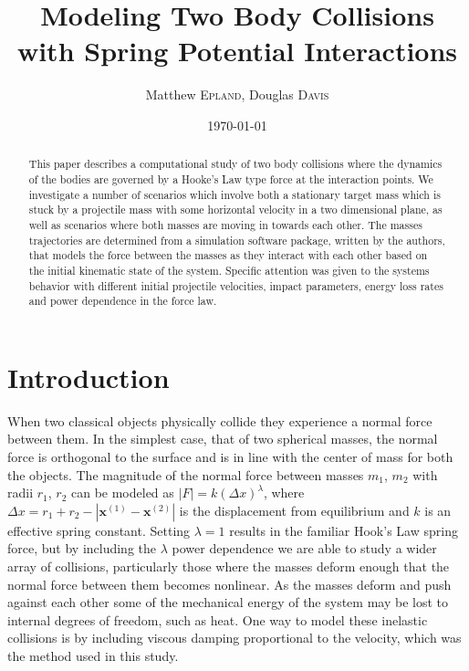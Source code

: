 \documentclass[aps,prl,floatfix,preprint,nofootinbib]{revtex4}
\begin{document}
\title{Modeling Two Body Collisions with Spring Potential Interactions}
\author{Matthew \textsc{Epland}, Douglas \textsc{Davis}}
\date{\today}

\hypersetup{pdftitle=Modeling Two Body Collisions}

\begin{abstract}
This paper describes a computational study of two body collisions where the dynamics of the bodies are governed by a Hooke's Law type force at the interaction points. We investigate a number of scenarios which involve both a stationary target mass which is stuck by a projectile mass with some horizontal velocity in a two dimensional plane, as well as scenarios where both masses are moving in towards each other. The masses trajectories are determined from a simulation software package, written by the authors, that models the force between the masses as they interact with each other based on the initial kinematic state of the system. Specific attention was given to the systems behavior with different initial projectile velocities, impact parameters, energy loss rates and power dependence in the force law.
\end{abstract}\maketitle
\section{Introduction}
When two classical objects physically collide they experience a normal force between them. In the simplest case, that of two spherical masses, the normal force is orthogonal to the surface and is in line with the center of mass for both the objects. The magnitude of the normal force between masses $m_{1}$, $m_{2}$ with radii $r_{1}$, $r_{2}$ can be modeled as $ \left| F \right| = k \left(\Delta x\right)^{\lambda}$, where $\Delta x = r_1 + r_2 - \left| \mathbf{x}^{(1)}-\mathbf{x}^{(2)} \right|$ is the displacement from equilibrium and $k$ is an effective spring constant. Setting $\lambda = 1$ results in the familiar Hook's Law spring force, but by including the $\lambda$ power dependence we are able to study a wider array of collisions, particularly those where the masses deform enough that the normal force between them becomes nonlinear. As the masses deform and push against each other some of the mechanical energy of the system may be lost to internal degrees of freedom, such as heat. One way to model these inelastic collisions is by including viscous damping proportional to the velocity, which was the method used in this study.
\end{document}
